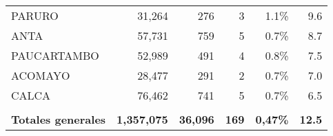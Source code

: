\begin{tabular}{lrrrrr}
	\cellcolor[HTML]{FFFFC7}PARURO        & 31,264             & 276                                 & 3                  & 1.1\%                      & 9.6                                                                                    \\
	\cellcolor[HTML]{FFFFC7}ANTA          & 57,731             & 759                                 & 5                  & 0.7\%                      & 8.7                                                                                    \\
	\cellcolor[HTML]{FFFFC7}PAUCARTAMBO   & 52,989             & 491                                 & 4                  & 0.8\%                      & 7.5                                                                                    \\
	\cellcolor[HTML]{FFFFC7}ACOMAYO       & 28,477             & 291                                 & 2                  & 0.7\%                      & 7.0                                                                                    \\
	\cellcolor[HTML]{FFFFC7}CALCA         & 76,462             & 741                                 & 5                  & 0.7\%                      & 6.5                                                                                    \\
	&                    &                                     &                    &                            &                                                                                        \\
	\rowcolor[HTML]{ECF4FF} 
	\textbf{Totales generales}            & \textbf{1,357,075} & \textbf{36,096}                     & \textbf{169}       & \textbf{0,47\%}            & \textbf{12.5}                                                                         
\end{tabular}